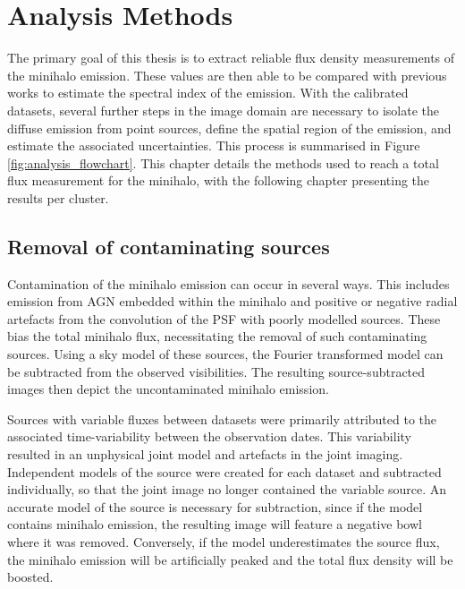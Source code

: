 \chapter[Analysis Tools]{Analysis Methods}
\label{Chap:Analysis}

The primary goal of this thesis is to extract reliable flux density measurements of the minihalo emission. These values are then able to be compared with previous works to estimate the spectral index of the emission. With the calibrated datasets, several further steps in the image domain are necessary to isolate the diffuse emission from point sources, define the spatial region of the emission, and estimate the associated uncertainties. This process is summarised in Figure \ref{fig:analysis_flowchart}. This chapter details the methods used to reach a total flux measurement for the minihalo, with the following chapter presenting the results per cluster. 



\section{Removal of contaminating sources}
\label{sec:source_subtraction}
Contamination of the minihalo emission can occur in several ways. This includes emission from AGN embedded within the minihalo and positive or negative radial artefacts from the convolution of the PSF with poorly modelled sources. These bias the total minihalo flux, necessitating the removal of such contaminating sources. Using a sky model of these sources, the Fourier transformed model can be subtracted from the observed visibilities. The resulting source-subtracted images then depict the uncontaminated minihalo emission. 

Sources with variable fluxes between datasets were primarily attributed to the associated time-variability between the observation dates. This variability resulted in an unphysical joint model and artefacts in the joint imaging. Independent models of the source were created for each dataset and subtracted individually, so that the joint image no longer contained the variable source. An accurate model of the source is necessary for subtraction, since if the model contains minihalo emission, the resulting image will feature a negative bowl where it was removed. Conversely, if the model underestimates the source flux, the minihalo emission will be artificially peaked and the total flux density will be boosted. 

